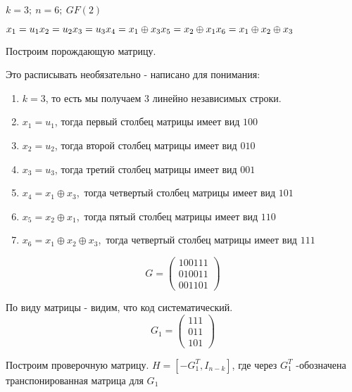 \documentclass[../main.tex]{subfiles}
\begin{document}
\noindent
$k = 3;\ n = 6;\ GF(2)$ 

\noindent
$
x_1=u_1\newline
x_2=u_2\newline
x_3=u_3\newline
x_4=x_1\oplus x_3\newline
x_5=x_2\oplus x_1\newline
x_6=x_1\oplus x_2\oplus x_3
$

Построим порождающую матрицу. 

Это расписывать необязательно - написано для понимания:
\begin{enumerate}
    \item $k = 3$, то есть мы получаем 3 линейно независимых строки.
    \item $x_1=u_1$, тогда первый столбец матрицы имеет вид $100$
    \item $x_2=u_2$, тогда второй столбец матрицы имеет вид $010$
    \item $x_3=u_3$, тогда третий столбец матрицы имеет вид $001$
    \item $x_4=x_1\oplus x_3$,\ тогда четвертый столбец матрицы имеет вид $101$
    \item $x_5=x_2\oplus x_1$,\ тогда пятый столбец матрицы имеет вид $110$ 
    \item $x_6=x_1\oplus x_2\oplus x_3$,\ тогда четвертый столбец матрицы имеет вид $111$
\end{enumerate}

\begin{equation*}
    G = \left( 
    \begin{array}{cccccc}
         100111  \\
         010011  \\
         001101
    \end{array}
    \right)
\end{equation*} 

По виду матрицы - видим, что код систематический. 
\begin{equation*}
    G_1 = \left( 
    \begin{array}{ccc}
         111  \\
         011  \\
         101
    \end{array}
    \right)
\end{equation*} 

Построим проверочную матрицу. \newline
$H=[-G^{T}_{1},I_{n-k}]$, где через $G^{T}_{1}$ -обозначена транспонированная матрица для $G_1$
\end{document}

